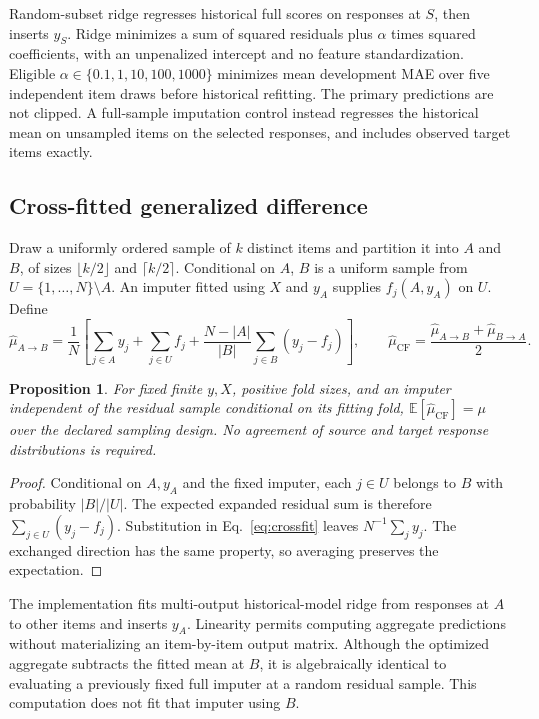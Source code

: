 \documentclass{article}
\newtheorem{proposition}{Proposition}
\begin{document}
Random-subset ridge regresses historical full scores on responses at $S$, then inserts $y_S$. Ridge minimizes a sum of squared residuals plus $\alpha$ times squared coefficients, with an unpenalized intercept and no feature standardization. Eligible $\alpha\in\{0.1,1,10,100,1000\}$ minimizes mean development MAE over five independent item draws before historical refitting. The primary predictions are not clipped. A full-sample imputation control instead regresses the historical mean on unsampled items on the selected responses, and includes observed target items exactly.

\subsection{Cross-fitted generalized difference}\label{sec:crossfit}
Draw a uniformly ordered sample of $k$ distinct items and partition it into $A$ and $B$, of sizes $\lfloor k/2\rfloor$ and $\lceil k/2\rceil$. Conditional on $A$, $B$ is a uniform sample from $U=\{1,\ldots,N\}\setminus A$. An imputer fitted using $X$ and $y_A$ supplies $f_j(A,y_A)$ on $U$. Define
\begin{equation}\label{eq:crossfit}
 \widehat\mu_{A\to B}=\frac1N\left[\sum_{j\in A}y_j+\sum_{j\in U}f_j+
 \frac{N-|A|}{|B|}\sum_{j\in B}(y_j-f_j)\right],\qquad
 \widehat\mu_{\mathrm{CF}}=\frac{\widehat\mu_{A\to B}+\widehat\mu_{B\to A}}2.
\end{equation}
\begin{proposition}\label{prop:unbiased}
For fixed finite $y,X$, positive fold sizes, and an imputer independent of the residual sample conditional on its fitting fold, $\mathbb E[\widehat\mu_{\mathrm{CF}}]=\mu$ over the declared sampling design. No agreement of source and target response distributions is required.
\end{proposition}
\begin{proof}
Conditional on $A,y_A$ and the fixed imputer, each $j\in U$ belongs to $B$ with probability $|B|/|U|$. The expected expanded residual sum is therefore $\sum_{j\in U}(y_j-f_j)$. Substitution in Eq.~\eqref{eq:crossfit} leaves $N^{-1}\sum_j y_j$. The exchanged direction has the same property, so averaging preserves the expectation.
\end{proof}
The implementation fits multi-output historical-model ridge from responses at $A$ to other items and inserts $y_A$. Linearity permits computing aggregate predictions without materializing an item-by-item output matrix. Although the optimized aggregate subtracts the fitted mean at $B$, it is algebraically identical to evaluating a previously fixed full imputer at a random residual sample. This computation does not fit that imputer using $B$.
\end{document}
